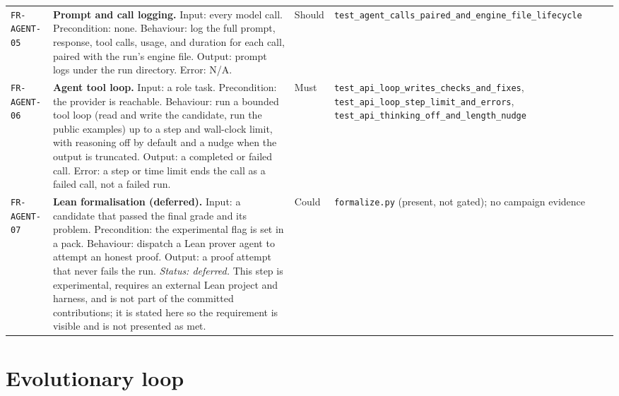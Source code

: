 \begin{longtable}{@{}>{\raggedright\arraybackslash}p{}>{\raggedright\arraybackslash}p{}p{}>{\raggedright\arraybackslash}p{}@{}}
\texttt{FR-AGENT-05} & \textbf{Prompt and call logging.} Input: every model call.
Precondition: none. Behaviour: log the full prompt, response, tool calls, usage,
and duration for each call, paired with the run's engine file. Output: prompt logs
under the run directory. Error: N/A. & Should &
\texttt{test\_agent\_calls\_paired\_and\_engine\_file\_lifecycle} \\
\addlinespace[2pt]

\texttt{FR-AGENT-06} & \textbf{Agent tool loop.} Input: a role task. Precondition:
the provider is reachable. Behaviour: run a bounded tool loop (read and write the
candidate, run the public examples) up to a step and wall-clock limit, with
reasoning off by default and a nudge when the output is truncated. Output: a
completed or failed call. Error: a step or time limit ends the call as a failed
call, not a failed run. & Must & \texttt{test\_api\_loop\_writes\_checks\_and\_fixes},
\texttt{test\_api\_loop\_step\_limit\_and\_errors},
\texttt{test\_api\_thinking\_off\_and\_length\_nudge} \\
\addlinespace[2pt]

\texttt{FR-AGENT-07} & \textbf{Lean formalisation (deferred).} Input: a candidate
that passed the final grade and its problem. Precondition: the experimental flag
is set in a pack. Behaviour: dispatch a Lean prover agent to attempt an honest
proof. Output: a proof attempt that never fails the run. \emph{Status: deferred.}
This step is experimental, requires an external Lean project and harness, and is
not part of the committed contributions; it is stated here so the requirement is
visible and is not presented as met. & Could & \texttt{formalize.py} (present,
not gated); no campaign evidence \\
\bottomrule
\end{longtable}

\section{Evolutionary loop}
\label{sec:fr-evo}

